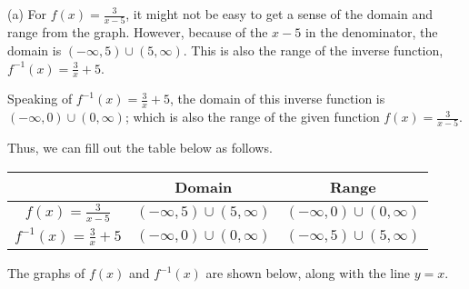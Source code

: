 \begin{solution}

(a) For $f(x) = \frac{3}{x-5}$, it might not be easy to get a sense of the domain and range from the graph. However, because of the $x-5$ in the denominator, the domain is $(-\infty, 5) \cup (5, \infty)$. This is also the range of the inverse function, $f^{-1}(x) = \frac{3}{x} + 5$. \newline 

Speaking of $f^{-1}(x) = \frac{3}{x} + 5$, the domain of this inverse function is $(-\infty, 0) \cup (0, \infty)$; which is also the range of the given function $f(x) = \frac{3}{x-5}$. \newline 

Thus, we can fill out the table below as follows. 

\begin{center}
\begin{tabular}{c|c|c}  
     & Domain & Range \\ \hline 
     $f(x)=\frac{3}{x-5}$ & \cellcolor{yellow} $(-\infty, 5) \cup (5, \infty)$ & \cellcolor{green} $(-\infty, 0) \cup (0, \infty)$ \\[4pt] \hline 
     $f^{-1}(x) = \frac{3}{x}+5$ & \cellcolor{green} $(-\infty, 0) \cup (0, \infty)$ & \cellcolor{yellow} $(-\infty, 5) \cup (5, \infty)$ \\[4pt]
\end{tabular}
\end{center}

\vspace{0.25in}

The graphs of $f(x)$ and $f^{-1}(x)$ are shown below, along with the line $y = x$.

\begin{center}
\end{center}


\end{solution}
